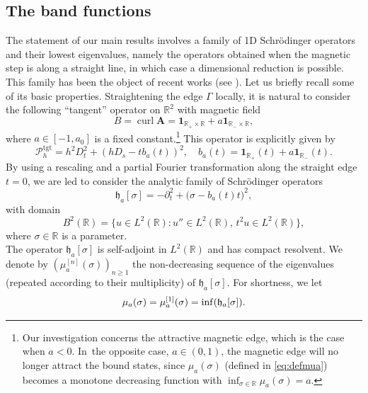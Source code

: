 \documentclass[JEP,XML,SOM,Unicode,NoFloatCountersInSection,published]{cedram}
\let\sep:
\DeclareMathOperator{\curl}{curl}
\let\sp\relax
\DeclareMathOperator{\sp}{sp}
\newcommand{\cP}{\mathcal{P}}
\theoremstyle{plain}
\theoremstyle{definition}
\newcommand{\A}{\boldsymbol{A}}
\newcommand{\R}{\mathbb{R}}
\begin{document}
\subsection{The band functions}
The statement of our main results involves a family of 1D Schrödinger operators and their lowest eigenvalues, namely
the operators obtained when the magnetic step is along a straight line, in which case a dimensional reduction is possible.
This family has been the object of recent works (see \cite{AK20, HPRS16}). Let us briefly recall some of its basic properties.
Straightening the edge $\Gamma$ locally, it is natural to consider the following \enquote{tangent} operator on $\R^2$ with magnetic field
\[
B=\curl\A=\mathbf 1_{\mathbb R_+\times\mathbb R }+a\mathbf 1_{\mathbb R_-\times\mathbb R},
\]
where $ a\in[-1,a_0]$ is a fixed constant.\footnote{Our investigation concerns the attractive magnetic edge, which is the case when $a<0$. In~the opposite case, $a \in (0,1)$, the magnetic edge will no longer attract the bound states, since $\mu_a(\sigma)$ (defined in \eqref{eq:defmua}) becomes a monotone decreasing function with $\inf_{\sigma \in{\mathbb R}} \mu_a(\sigma) = a$.} This operator is explicitly given by
\begin{equation}\label{eq.Ptgt}
\cP^{\mathrm{tgt}}_h=h^2D_t^2+(hD_s-tb_a(t))^2,\quad b_a(t)=\mathbf{1}_{\mathbb R_+}(t)+a\mathbf{1}_{\mathbb R_-}(t).
\end{equation}
By using a rescaling and a partial Fourier transformation along the straight edge $t=0$, we are led to consider the analytic family of Schrödinger operators
\begin{equation}\label{eq:ha}
\mathfrak h_a[\sigma]=-\partial^2_t+\bigl(\sigma-b_a(t)t\bigr)^2,
\end{equation}
with domain
\begin{equation}\label{eq:b2}
B^2(\R)=\{u\in L^2(\R) \sep u''\in L^2(\R),\,t^2u\in L^2(\R)\},
\end{equation}
where $\sigma\in\mathbb R$ is a parameter. \\
The operator $\mathfrak h_a[\sigma]$ is self-adjoint in $L^2(\R)$ and has compact resolvent. We denote by $(\mu^{[n]}_{a}(\sigma))_{n\geq 1}$ the non-decreasing sequence of the eigenvalues (repeated according to their multiplicity) of $\mathfrak h_a[\sigma]$. For shortness, we let
\begin{align}\label{eq:defmua}
\mu_a(\sigma)=\mu^{[1]}_{a}(\sigma) = \inf \sp(\mathfrak h_a[\sigma]).
\end{align}
\end{document}
